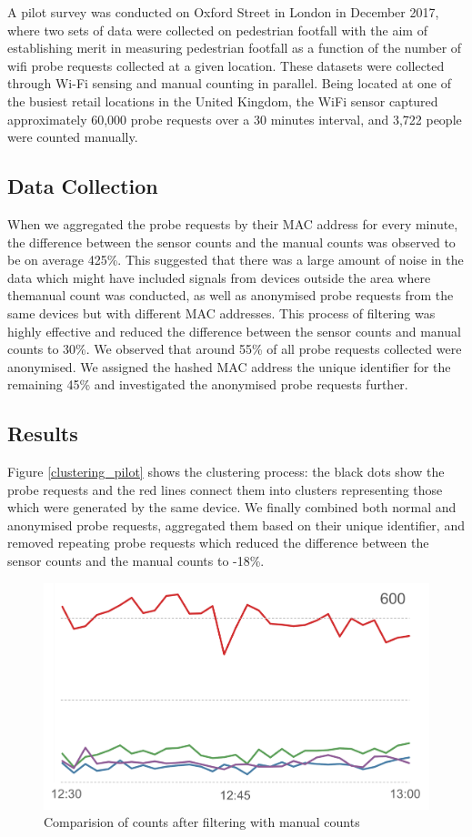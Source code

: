 A pilot survey was conducted on Oxford Street in London in December 2017, where two sets of data were collected on pedestrian footfall with the aim of establishing merit in measuring pedestrian footfall as a function of the number of wifi probe requests collected at a given location.
These datasets were collected through Wi-Fi sensing and manual counting in parallel.
Being located at one of the busiest retail locations in the United Kingdom, the WiFi sensor captured approximately 60,000 probe requests over a 30 minutes interval, and 3,722 people were counted manually.

\subsection{Data Collection}
When we aggregated the probe requests by their MAC address for every minute, the difference between the sensor counts and the manual counts was observed to be on average 425\%.
This suggested that there was a large amount of noise in the data which might have included signals from devices outside the area where themanual count was conducted, as well as anonymised probe requests from the same devices but with different MAC addresses.
This process of filtering was highly effective and reduced the difference between the sensor counts and manual counts to 30\%.
We observed that around 55\% of all probe requests collected were anonymised.
We assigned the hashed MAC address the unique identifier for the remaining 45\% and investigated the anonymised probe requests further.

\subsection{Results}
Figure \ref{clustering_pilot} shows the clustering process: the black dots show the probe requests and the red lines connect them into clusters representing those which were generated by the same device.
We finally combined both normal and anonymised probe requests, aggregated them based on their unique identifier, and removed repeating probe requests which reduced the difference between the sensor counts and the manual counts to -18\%.

\lipsum[2]

\begin{figure}
	\begin{center}
		\includegraphics [width=\linewidth] {images/pilot_counts_comparision.png}
		\caption{Comparision of counts after filtering with manual counts}
		\label{comparision_pilot}
	\end{center}
\end{figure}
